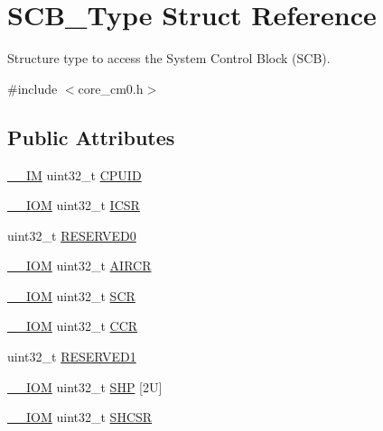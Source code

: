 \hypertarget{struct_s_c_b___type}{}\section{S\+C\+B\+\_\+\+Type Struct Reference}
\label{struct_s_c_b___type}


Structure type to access the System Control Block (S\+CB).  




{\ttfamily \#include $<$core\+\_\+cm0.\+h$>$}

\subsection*{Public Attributes}
\begin{DoxyCompactItemize}
\item 
\hyperlink{core__sc300_8h_a4cc1649793116d7c2d8afce7a4ffce43}{\+\_\+\+\_\+\+IM} uint32\+\_\+t \hyperlink{struct_s_c_b___type_a21e08d546d8b641bee298a459ea73e46}{C\+P\+U\+ID}
\item 
\hyperlink{core__sc300_8h_ab6caba5853a60a17e8e04499b52bf691}{\+\_\+\+\_\+\+I\+OM} uint32\+\_\+t \hyperlink{struct_s_c_b___type_a0ca18ef984d132c6bf4d9b61cd00f05a}{I\+C\+SR}
\item 
uint32\+\_\+t \hyperlink{struct_s_c_b___type_a10960cdc703f661c83a237d9c69db23c}{R\+E\+S\+E\+R\+V\+E\+D0}
\item 
\hyperlink{core__sc300_8h_ab6caba5853a60a17e8e04499b52bf691}{\+\_\+\+\_\+\+I\+OM} uint32\+\_\+t \hyperlink{struct_s_c_b___type_ad3e5b8934c647eb1b7383c1894f01380}{A\+I\+R\+CR}
\item 
\hyperlink{core__sc300_8h_ab6caba5853a60a17e8e04499b52bf691}{\+\_\+\+\_\+\+I\+OM} uint32\+\_\+t \hyperlink{struct_s_c_b___type_a3a4840c6fa4d1ee75544f4032c88ec34}{S\+CR}
\item 
\hyperlink{core__sc300_8h_ab6caba5853a60a17e8e04499b52bf691}{\+\_\+\+\_\+\+I\+OM} uint32\+\_\+t \hyperlink{struct_s_c_b___type_a2d6653b0b70faac936046a02809b577f}{C\+CR}
\item 
uint32\+\_\+t \hyperlink{struct_s_c_b___type_adddd65958c1c4c0301f62ede0a9bf12e}{R\+E\+S\+E\+R\+V\+E\+D1}
\item 
\hyperlink{core__sc300_8h_ab6caba5853a60a17e8e04499b52bf691}{\+\_\+\+\_\+\+I\+OM} uint32\+\_\+t \hyperlink{struct_s_c_b___type_a5c40d124f95a3f7f431a3d5409d6ad28}{S\+HP} \mbox{[}2\+U\mbox{]}
\item 
\hyperlink{core__sc300_8h_ab6caba5853a60a17e8e04499b52bf691}{\+\_\+\+\_\+\+I\+OM} uint32\+\_\+t \hyperlink{struct_s_c_b___type_a7b5ae9741a99808043394c4743b635c4}{S\+H\+C\+SR}

\end{DoxyCompactItemize}
